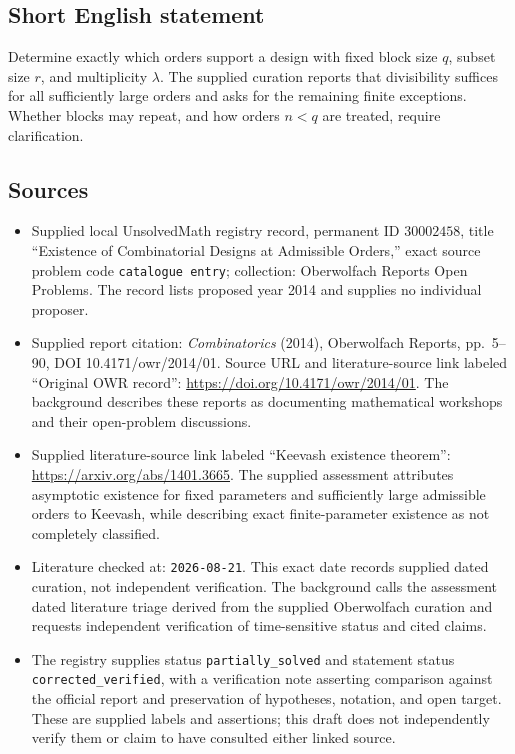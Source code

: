 \documentclass[11pt]{article}
\begin{document}
\subsection{Short English statement}
Determine exactly which orders support a design with fixed block size \(q\), subset size \(r\), and multiplicity \(\lambda\). The supplied curation reports that divisibility suffices for all sufficiently large orders and asks for the remaining finite exceptions. Whether blocks may repeat, and how orders \(n<q\) are treated, require clarification.
\subsection{Sources}
\begin{itemize}
\item Supplied local UnsolvedMath registry record, permanent ID \(30002458\), title ``Existence of Combinatorial Designs at Admissible Orders,'' exact source problem code \texttt{catalogue entry}; collection: Oberwolfach Reports Open Problems. The record lists proposed year 2014 and supplies no individual proposer.
\item Supplied report citation: \emph{Combinatorics} (2014), Oberwolfach Reports, pp.\ 5--90, DOI 10.4171/owr/2014/01. Source URL and literature-source link labeled ``Original OWR record'': \url{https://doi.org/10.4171/owr/2014/01}. The background describes these reports as documenting mathematical workshops and their open-problem discussions.
\item Supplied literature-source link labeled ``Keevash existence theorem'': \url{https://arxiv.org/abs/1401.3665}. The supplied assessment attributes asymptotic existence for fixed parameters and sufficiently large admissible orders to Keevash, while describing exact finite-parameter existence as not completely classified.
\item Literature checked at: \texttt{2026-08-21}. This exact date records supplied dated curation, not independent verification. The background calls the assessment dated literature triage derived from the supplied Oberwolfach curation and requests independent verification of time-sensitive status and cited claims.
\item The registry supplies status \texttt{partially\_solved} and statement status \texttt{corrected\_verified}, with a verification note asserting comparison against the official report and preservation of hypotheses, notation, and open target. These are supplied labels and assertions; this draft does not independently verify them or claim to have consulted either linked source.
\end{itemize}
\end{document}
